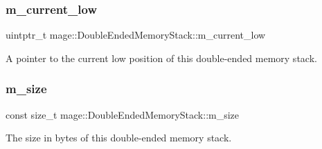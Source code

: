 \subsubsection{\texorpdfstring{m\+\_\+current\+\_\+low}{m\_current\_low}}
{\footnotesize\ttfamily uintptr\+\_\+t mage\+::\+Double\+Ended\+Memory\+Stack\+::m\+\_\+current\+\_\+low\hspace{0.3cm}{\ttfamily [private]}}

A pointer to the current low position of this double-\/ended memory stack. \hypertarget{classmage_1_1_double_ended_memory_stack_a3a3ff5dbdcca2fcd2939e8e92528abcc}{}\label{classmage_1_1_double_ended_memory_stack_a3a3ff5dbdcca2fcd2939e8e92528abcc} 
\subsubsection{\texorpdfstring{m\+\_\+size}{m\_size}}
{\footnotesize\ttfamily const size\+\_\+t mage\+::\+Double\+Ended\+Memory\+Stack\+::m\+\_\+size\hspace{0.3cm}{\ttfamily [private]}}

The size in bytes of this double-\/ended memory stack. 